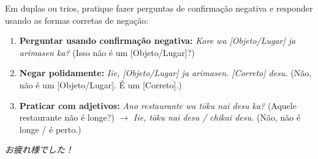 \documentclass[12pt,a4paper]{article}
\begin{document}
\vspace{0.5cm}

\begin{tcolorbox}[colback=jppurple!6, colframe=jppurple, title=\textbf{Dinâmica em Grupo}, fonttitle=\bfseries]
\small
Em duplas ou trios, pratique fazer perguntas de confirmação negativa e responder usando as formas corretas de negação:

\vspace{0.2cm}

\begin{enumerate}[leftmargin=*]
    \item \textbf{Perguntar usando confirmação negativa:} \textit{Kore wa [Objeto/Lugar] ja arimasen ka?} (Isso não é um [Objeto/Lugar]?)
    \item \textbf{Negar polidamente:} \textit{Iie, [Objeto/Lugar] ja arimasen. [Correto] desu.} (Não, não é um [Objeto/Lugar]. É um [Correto].)
    \item \textbf{Praticar com adjetivos:} \textit{Ano restaurante wa tōku nai desu ka?} (Aquele restaurante não é longe?) $\rightarrow$ \textit{Iie, tōku nai desu / chikai desu.} (Não, não é longe / é perto.)
\end{enumerate}
\end{tcolorbox}

\vspace{0.4cm}

\begin{center}
    \small\color{gray} \textit{お疲れ様でした！}
\end{center}
\end{document}
